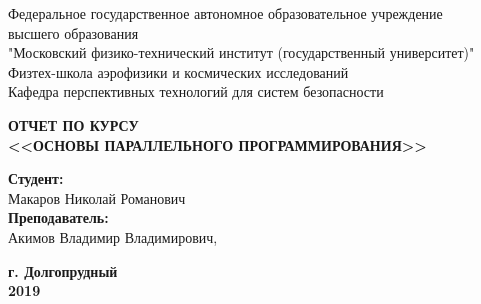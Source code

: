 \documentclass[12pt]{report}
\begin{document}
	\begin{titlepage}
		\begin{center}
				Федеральное государственное автономное образовательное учреждение\\
				высшего образования\\
				"Московский физико-технический институт (государственный университет)"\\
				Физтех-школа аэрофизики и космических исследований\\
				Кафедра перспективных технологий для систем безопасности\\
		\end{center}
		\begin{center}
			\vspace{2cm}
			\textbf{ОТЧЕТ ПО КУРСУ\\
			<<ОСНОВЫ ПАРАЛЛЕЛЬНОГО ПРОГРАММИРОВАНИЯ>>}\\
			\vspace{5cm}
		\end{center}
			\begin{paracol}{2}
				\switchcolumn
				\textbf{Студент:}\\
				Макаров Николай Романович\\
				\textbf{Преподаватель:}\\
				Акимов Владимир Владимирович,\\
			\end{paracol}
		\begin{center}
			\vspace{6cm}
			\textbf{г. Долгопрудный\\
				2019}
		\end{center}
	\end{titlepage}


\tableofcontents
\end{document}
